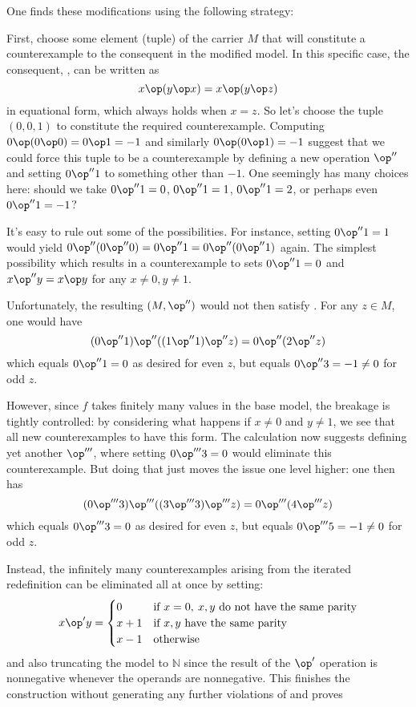 One finds these modifications using the following strategy:

First, choose some element (tuple) of the carrier $M$ that will constitute a counterexample to the
consequent in the modified model. In this specific case, the consequent, , can be written as
$$ x \op (y \op x) = x \op (y \op z)$$
in equational form, which always holds when $x = z$. So let's choose the tuple $(0,0,1)$
to constitute the required counterexample. Computing $0 \op (0 \op 0) = 0 \op 1 = -1$ and similarly
$0 \op (0 \op 1) = -1$ suggest that we could force this tuple to be a counterexample by defining a new
operation $\op''$ and setting
$0 \op'' 1$ to something other than $-1$. One seemingly has many choices here: should we take
$0 \op'' 1 =0$, $0 \op'' 1 = 1$, $0 \op'' 1 = 2$, or perhaps even $0 \op'' 1 = -1$?

It's easy to rule out some of the possibilities. For instance, setting $0 \op'' 1 = 1$ would
yield $0 \op'' (0 \op'' 0) = 0 \op'' 1 = 0 \op'' (0 \op'' 1)$ again. The simplest possibility which results in
a counterexample to  sets $0 \op'' 1 = 0$ and $x \op'' y = x \op y$ for any $x \neq 0, y \neq 1$.

Unfortunately, the resulting $(M,\op'')$ would not then satisfy . For any $z \in M$, one would have
$$ (0 \op'' 1) \op'' ((1 \op'' 1) \op'' z) = 0 \op'' (2 \op'' z)$$
which equals $0 \op'' 1 = 0$ as desired for even $z$, but equals $0 \op'' 3 = -1 \neq 0$ for odd $z$.

However, since $f$ takes finitely many values in the base model, the breakage is tightly controlled:
by considering what happens if $x \neq 0$ and $y \neq 1$, we see that all new counterexamples to 
have this form. The calculation now suggests defining yet another $\op'''$, where setting
$0 \op''' 3 = 0$ would eliminate
this counterexample. But doing that just moves the issue one level higher: one then has
$$ (0 \op''' 3) \op''' ((3 \op''' 3) \op''' z) = 0 \op''' (4 \op''' z)$$ which equals $0 \op''' 3 = 0$ as desired for even $z$, but equals $0 \op''' 5 = -1 \neq 0$ for odd $z$.

Instead, the infinitely many counterexamples arising from the iterated redefinition can be eliminated
all at once by setting:
$$x \op' y = \begin{cases} 0 & \text{if } x=0,\: x,y \text{ do not have the same parity} \\  x+1 & \text{if } x,y \text{ have the same parity} \\ x -1 & \text{otherwise} \end{cases}$$
and also truncating the model to $\mathbb{N}$ since the result of the $\op'$
operation is nonnegative whenever the operands are nonnegative. This finishes the construction without generating any further violations of  and proves


